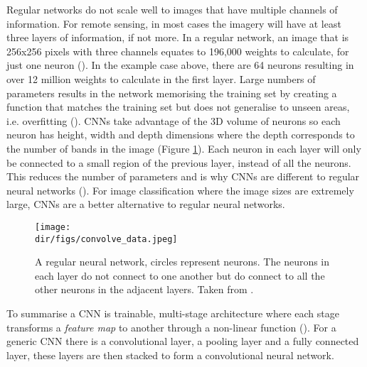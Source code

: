 Regular networks do not scale well to images that have multiple channels of information. For remote sensing, in most cases the imagery will have at least three layers of information, if not more. In a regular network, an image that is 256x256 pixels with three channels equates to 196,000 weights to calculate, for just one neuron (\cite{karpathy_cnn1}). In the example case above, there are 64 neurons resulting in over 12 million weights to calculate in the first layer. Large numbers of parameters results in the network memorising the training set by creating a function that matches the training set but does not generalise to unseen areas, i.e. overfitting (\cite{dietterich95}). CNNs take advantage of the 3D volume of neurons so each neuron has height, width and depth dimensions where the depth corresponds to the number of bands in the image (Figure \ref{fig.convolve_data}). Each neuron in each layer will only be connected to a small region of the previous layer, instead of all the neurons. This reduces the number of parameters and is why CNNs are different to regular neural networks (\cite{karpathy_cnn1}). For image classification where the image sizes are extremely large, CNNs are a better alternative to regular neural networks.
\begin{figure}[htbp]
    \centering
    \texttt{[image: \\dir/figs/convolve\_data.jpeg]}
    \caption[Basic Neural Network architecture]{A regular neural network, circles represent neurons. The neurons in each layer do not connect to one another but do connect to all the other neurons in the adjacent layers. Taken from \citet{karpathy_cnn1}. }
    \label{fig.convolve_data}
\end{figure}
\par
To summarise a CNN is trainable, multi-stage architecture where each stage transforms a \textit{feature map} to another through a non-linear function (\cite{lecun10}). For a generic CNN there is a convolutional layer, a pooling layer and a fully connected layer, these layers are then stacked to form a convolutional neural network.


